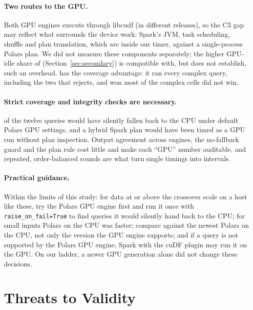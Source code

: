 \documentclass[sigconf, nonacm]{acmart}
\begin{document}
\paragraph{Two routes to the GPU.} Both GPU engines execute through libcudf
(in different releases), so the C3 gap may reflect what surrounds the device
work: Spark's JVM, task scheduling, shuffle and plan translation, which are
inside our timer, against a single-process Polars plan. We did not measure
these components separately; the higher GPU-idle share of \sparkgpu{}
(Section~\ref{sec:secondary}) is compatible with, but does not establish, such
an overhead. \sparkgpu{} has the coverage advantage: it ran every complex
query, including the two that \polarsgpu{} rejects, and won most of the complex
cells \polarsgpu{} did not win.

\paragraph{Strict coverage and integrity checks are necessary.}
 of the twelve queries would have silently fallen back to the CPU under default Polars GPU
settings, and a hybrid Spark plan would have been timed as a GPU run without
plan inspection. Output agreement across engines, the no-fallback guard and the
plan rule cost little and make each ``GPU'' number auditable, and repeated,
order-balanced rounds are what turn single timings into intervals.

\paragraph{Practical guidance.} Within the limits of this study: for data at
or above the crossover scale on a host like these, try the Polars GPU engine
first and run it once with \texttt{raise\_on\_fail=True} to find queries it
would silently hand back to the CPU; for small inputs Polars on the CPU was
faster; compare against the newest Polars on the CPU, not only the version the
GPU engine supports; and if a query is not supported by the Polars GPU engine,
Spark with the cuDF plugin may run it on the GPU. On our ladder, a newer GPU
generation alone did not change these decisions.

\section{Threats to Validity}
\label{sec:threats}
\end{document}
